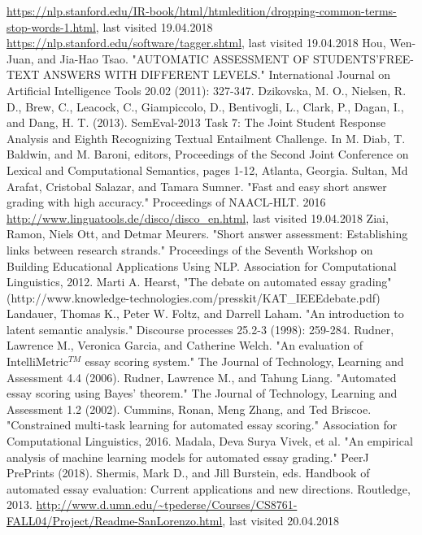 \documentclass[rnd]{mas_report}
\begin{document}
\begin{thebibliography}{3}
 \url{https://nlp.stanford.edu/IR-book/html/htmledition/dropping-common-terms-stop-words-1.html}, last visited 19.04.2018
 \url{https://nlp.stanford.edu/software/tagger.shtml}, last visited 19.04.2018
 Hou, Wen-Juan, and Jia-Hao Tsao. "AUTOMATIC ASSESSMENT OF STUDENTS'FREE-TEXT ANSWERS WITH DIFFERENT LEVELS." International Journal on Artificial Intelligence Tools 20.02 (2011): 327-347.
 Dzikovska, M. O., Nielsen, R. D., Brew, C., Leacock, C., Giampiccolo, D., Bentivogli, L., Clark, P., Dagan, I., and Dang, H. T. (2013). SemEval-2013 Task 7: The Joint Student Response Analysis and Eighth Recognizing Textual Entailment Challenge. In M. Diab, T. Baldwin, and M. Baroni, editors, Proceedings of the Second Joint Conference on Lexical and Computational Semantics, pages 1-12, Atlanta, Georgia.
 Sultan, Md Arafat, Cristobal Salazar, and Tamara Sumner. "Fast and easy short answer grading with high accuracy." Proceedings of NAACL-HLT. 2016
 \url{http://www.linguatools.de/disco/disco_en.html}, last visited 19.04.2018
 Ziai, Ramon, Niels Ott, and Detmar Meurers. "Short answer assessment: Establishing links between research strands." Proceedings of the Seventh Workshop on Building Educational Applications Using NLP. Association for Computational Linguistics, 2012.
 Marti A. Hearst, "The debate on automated essay grading" (http://www.knowledge-technologies.com/presskit/KAT\_IEEEdebate.pdf) 
 Landauer, Thomas K., Peter W. Foltz, and Darrell Laham. "An introduction to latent semantic analysis." Discourse processes 25.2-3 (1998): 259-284.
 Rudner, Lawrence M., Veronica Garcia, and Catherine Welch. "An evaluation of IntelliMetric$^{TM}$ essay scoring system." The Journal of Technology, Learning and Assessment 4.4 (2006).
 Rudner, Lawrence M., and Tahung Liang. "Automated essay scoring using Bayes' theorem." The Journal of Technology, Learning and Assessment 1.2 (2002).
 Cummins, Ronan, Meng Zhang, and Ted Briscoe. "Constrained multi-task learning for automated essay scoring." Association for Computational Linguistics, 2016.
 Madala, Deva Surya Vivek, et al. "An empirical analysis of machine learning models for automated essay grading." PeerJ PrePrints (2018).
 Shermis, Mark D., and Jill Burstein, eds. Handbook of automated essay evaluation: Current applications and new directions. Routledge, 2013.
\url{http://www.d.umn.edu/~tpederse/Courses/CS8761-FALL04/Project/Readme-SanLorenzo.html}, last visited 20.04.2018

\end{thebibliography}
\end{document}
